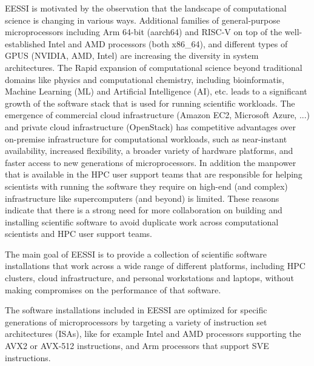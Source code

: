 EESSI is motivated by the observation that the landscape of computational science is changing in various ways. Additional families of general-purpose microprocessors including Arm 64-bit (aarch64) and RISC-V on top of the well-established Intel and AMD processors (both x86\_64), and different types of GPUS (NVIDIA, AMD, Intel) are increasing the diversity in system architectures. The Rapid expansion of computational science beyond traditional domains like physics and computational chemistry, including bioinformatis, Machine Learning (ML) and Artificial Intelligence (AI), etc. leads to a significant growth of the software stack that is used for running scientific workloads. The emergence of commercial cloud infrastructure (Amazon EC2, Microsoft Azure, ...) and private cloud infrastructure (OpenStack) has competitive advantages over on-premise infrastructure for computational workloads, such as near-instant availability, increased flexibility, a broader variety of hardware platforms, and faster access to new generations of microprocessors. In addition the manpower that is available in the HPC user support teams that are responsible for helping scientists with running the software they require on high-end (and complex) infrastructure like supercomputers (and beyond) is limited. These reasons indicate that there is a strong need for more collaboration on building and installing scientific software to avoid duplicate work across computational scientists and HPC user support teams.

The main goal of EESSI is to provide a collection of scientific software installations that work across a wide range of different platforms, including HPC clusters, cloud infrastructure, and personal workstations and laptops, without making compromises on the performance of that software.

The software installations included in EESSI are optimized for specific generations of microprocessors by targeting a variety of instruction set architectures (ISAs), like for example Intel and AMD processors supporting the AVX2 or AVX-512 instructions, and Arm processors that support SVE instructions.

